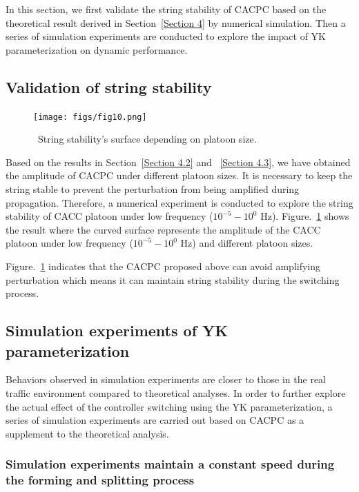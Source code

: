 \documentclass[journal]{IEEEtran}
\begin{document}
In this section, we first validate the string stability of CACPC based on the theoretical result derived in Section~\ref{Section 4} by numerical simulation. Then a series of simulation experiments are conducted to explore the impact of YK parameterization on dynamic performance.

\subsection{Validation of string stability}
\label{Section 5.1}

\begin{figure}
  \centering
  \texttt{[image: figs/fig10.png]}
  \caption{~String stability's surface depending on platoon size.}
  \label{fig10}
\end{figure}

Based on the results in Section~\ref{Section 4.2} and ~\ref{Section 4.3}, we have obtained the amplitude of CACPC under different platoon sizes. It is necessary to keep the string stable to prevent the perturbation from being amplified during propagation. Therefore, a numerical experiment is conducted to explore the string stability of CACC platoon under low frequency ($10^{-5} - 10^0$ Hz). Figure.~\ref{fig10} shows the result where the curved surface represents the amplitude of the CACC platoon under low frequency ($10^{-5} - 10^0$ Hz) and different platoon sizes.

Figure.~\ref{fig10} indicates that the CACPC proposed above can avoid amplifying perturbation which means it can maintain string stability during the switching process.

\subsection{Simulation experiments of YK parameterization}
\label{Section 5.2}

Behaviors observed in simulation experiments are closer to those in the real traffic environment compared to theoretical analyses. In order to further explore the actual effect of the controller switching using the YK parameterization, a series of simulation experiments are carried out based on CACPC as a supplement to the theoretical analysis.

\subsubsection{Simulation experiments maintain a constant speed during the forming and splitting process}
\label{Section 5.2.1}
\end{document}
